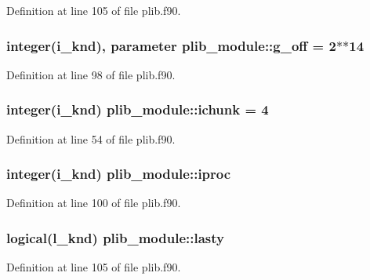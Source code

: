 Definition at line 105 of file plib.\-f90.

\hypertarget{classplib__module_aa3f6bda8ab61c2acbdaf18afe105dbae}{
\subsubsection[{g\-\_\-off}]{\setlength{\rightskip}{0pt plus 5cm}integer(i\-\_\-knd), parameter plib\-\_\-module\-::g\-\_\-off = 2$\ast$$\ast$14}}\label{classplib__module_aa3f6bda8ab61c2acbdaf18afe105dbae}


Definition at line 98 of file plib.\-f90.

\hypertarget{classplib__module_a0982ec611aac37b53db96a8266ff5c48}{
\subsubsection[{ichunk}]{\setlength{\rightskip}{0pt plus 5cm}integer(i\-\_\-knd) plib\-\_\-module\-::ichunk = 4}}\label{classplib__module_a0982ec611aac37b53db96a8266ff5c48}


Definition at line 54 of file plib.\-f90.

\hypertarget{classplib__module_a20a10200b84fc53b3f9703d080eb4f41}{
\subsubsection[{iproc}]{\setlength{\rightskip}{0pt plus 5cm}integer(i\-\_\-knd) plib\-\_\-module\-::iproc}}\label{classplib__module_a20a10200b84fc53b3f9703d080eb4f41}


Definition at line 100 of file plib.\-f90.

\hypertarget{classplib__module_ac8204e5b33211c1fe40e991a11d63f95}{
\subsubsection[{lasty}]{\setlength{\rightskip}{0pt plus 5cm}logical(l\-\_\-knd) plib\-\_\-module\-::lasty}}\label{classplib__module_ac8204e5b33211c1fe40e991a11d63f95}


Definition at line 105 of file plib.\-f90.

